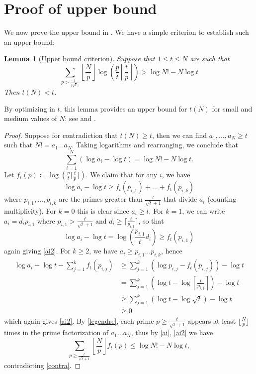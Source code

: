 \documentclass[12pt,a4paper,reqno]{amsart}
\numberwithin{equation}{section}
\theoremstyle{plain}
\newtheorem{lemma}[theorem]{Lemma}
\theoremstyle{definition}
\begin{document}
\section{Proof of upper bound}

We now prove the upper bound in .  We have a simple criterion to establish such an upper bound:

\begin{lemma}[Upper bound criterion]\label{upper-crit}  Suppose that $1 \leq t \leq N$ are such that
\begin{equation}\label{contra}
   \sum_{p > \frac{t}{\lfloor\sqrt{t}\rfloor}} \left\lfloor \frac{N}{p} \right\rfloor \log \left( \frac{p}{t} \left\lceil \frac{t}{p} \right\rceil \right) > \log N! - N \log t
\end{equation}
Then $t(N) < t$.
\end{lemma}

By optimizing in $t$, this lemma provides an upper bound for $t(N)$ for small and medium values of $N$: see  and .

\begin{proof} Suppose for contradiction that $t(N) \geq t$, then we can find $a_1,\dots,a_N \geq t$ such that $N! = a_1 \dots a_N$.  Taking logarithms and rearranging, we conclude that
\begin{equation}\label{ai}
   \sum_{i=1}^N (\log a_i - \log t) = \log N! - N \log t.
\end{equation}
Let $f_t(p) \coloneqq \log (\frac{p}{t} \lceil \frac{t}{p} \rceil)$.  We claim that for any $i$, we have
\begin{equation}\label{ai2}
  \log a_i - \log t \geq f_t(p_{i,1}) + \dots + f_t(p_{i,k})
\end{equation}
where $p_{i,1},\dots,p_{i,k}$ are the primes greater than $\frac{t}{\sqrt{t}+1}$ that divide $a_i$ (counting multiplicity).  For $k=0$ this is clear since $a_i \geq t$.  For $k=1$, we can write $a_i = d_i p_{i,1}$ where $p_{i,1} > \frac{t}{\sqrt{t}+1}$ and $d_i \geq \lceil \frac{t}{p_{i,1}} \rceil$, so that
$$ \log a_i - \log t = \log \left(\frac{p_{i,1}}{t}d_i \right) \geq f_t(p_{i,1})$$
again giving \eqref{ai2}.  For $k \geq 2$, we have $a_i \geq p_{i,1} \dots p_{i,k}$, hence
\begin{align*}
  \log a_i - \log t - \sum_{j=1}^k f_t(p_{i,j}) &\geq \sum_{j=1}^k (\log p_{i,j} - f_t(p_{i,j})) - \log t \\
  &= \sum_{j=1}^k \left(\log t - \log \left \lceil \frac{t}{p_{i,j}} \right\rceil \right) - \log t \\
  &\geq \sum_{j=1}^k \left(\log t - \log \sqrt{t} \right) - \log t \\
  &\geq 0
\end{align*}
which again gives \eqref{ai2}.  By \eqref{legendre}, each prime $p \geq \frac{t}{\sqrt{t}+1}$ appears at least $\lfloor \frac{N}{p}\rfloor$ times in the prime factorization of $a_1 \dots a_N$, thus by \eqref{ai}, \eqref{ai2} we have
$$ \sum_{p \geq \frac{t}{\sqrt{t}+1}} \left\lfloor \frac{N}{p} \right\rfloor f_t(p) \leq \log N! - N \log t,$$
contradicting \eqref{contra}.
\end{proof}
\end{document}
